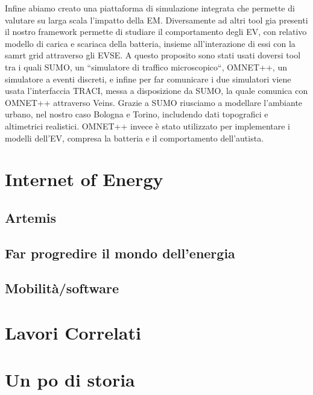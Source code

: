 Infine abiamo creato una piattaforma di simulazione integrata che permette di valutare su larga scala
l'impatto della EM. Diversamente ad altri tool gia presenti il nostro framework permette di studiare 
il comportamento degli EV, con relativo modello di carica e scariaca della batteria, insieme all'interazione
di essi con la samrt grid attraverso gli EVSE. A questo proposito sono stati usati doversi tool tra i quali
SUMO, un ``simulatore di traffico microscopico``, OMNET++, un simulatore a eventi discreti, e infine per 
far comunicare i due simulatori viene usata l'interfaccia TRACI, messa a disposizione da SUMO, la quale
comunica con OMNET++ attraverso Veins. Grazie a SUMO riusciamo a modellare l'ambiante urbano, nel nostro 
caso Bologna e Torino, includendo dati topografici e altimetrici realistici. OMNET++ invece è stato
utilizzato per implementare i modelli dell'EV, compresa la batteria e il comportamento dell'autista.

\section{Internet of Energy}

\subsection{Artemis}


\subsection{Far progredire il mondo dell'energia}


\subsection{Mobilità/software}

%

\section{Lavori Correlati}



\section{Un po di storia} 

